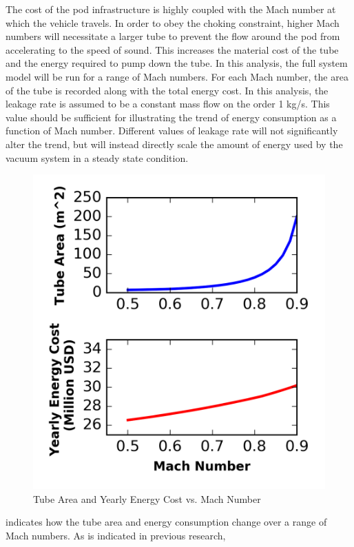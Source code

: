 The cost of the pod infrastructure is highly coupled with the
Mach number at which the vehicle travels. In order to obey the choking constraint,
higher Mach numbers will necessitate a larger tube to prevent the flow around
the pod from accelerating to the speed of sound. This increases the material
cost of the tube and the energy required to pump down the tube. In this analysis,
the full system model will be run for a range of Mach numbers.
For each Mach number, the area of the tube is recorded along with the total energy cost.
In this analysis, the leakage rate is assumed to be a constant mass flow on the order 1 kg/s.
This value should be sufficient for illustrating the trend of energy
consumption as a function of Mach number. Different values of leakage rate will
not significantly alter the trend, but will instead directly scale the amount
of energy used by the vacuum system in a steady state condition.
\begin{figure}
	\centering
	\includegraphics{../../images/graphs/mach_trades/pressure_vs_mach.png}
	\caption{Tube Area and Yearly Energy Cost vs. Mach Number}
	\label{fig:tube_area_cost_vs_mach}
\end{figure}
 indicates how the tube area and energy
consumption change over a range of Mach numbers. As is indicated in previous research,
